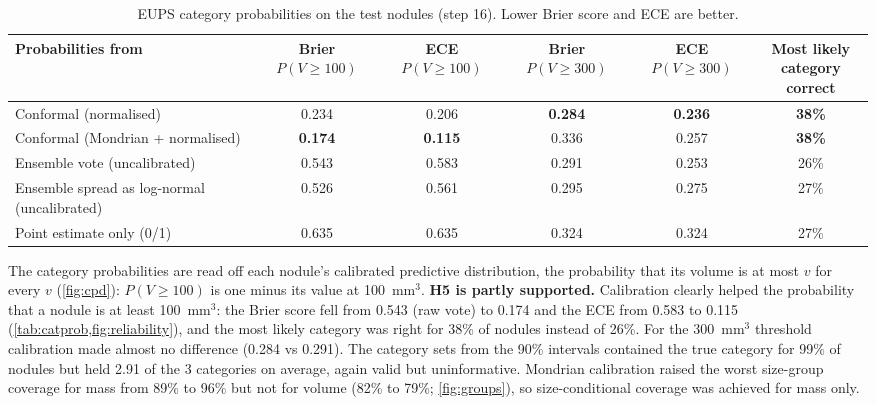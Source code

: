 \begin{table}[!htbp]
\centering\small
\caption{EUPS category probabilities on the test nodules (step 16). Lower Brier score and ECE are better.}
\label{tab:catprob}
\begin{adjustbox}{max width=\linewidth}
\begin{tabular}{l ccccc}
\toprule
Probabilities from & \makecell{Brier\\$P(V\geq100)$} & \makecell{ECE\\$P(V\geq100)$} & \makecell{Brier\\$P(V\geq300)$} & \makecell{ECE\\$P(V\geq300)$} & \makecell{Most likely\\category correct} \\
\midrule
Conformal (normalised) & 0.234 & 0.206 & \textbf{0.284} & \textbf{0.236} & \textbf{38\%} \\
Conformal (Mondrian + normalised) & \textbf{0.174} & \textbf{0.115} & 0.336 & 0.257 & \textbf{38\%} \\
Ensemble vote (uncalibrated) & 0.543 & 0.583 & 0.291 & 0.253 & 26\% \\
Ensemble spread as log-normal (uncalibrated) & 0.526 & 0.561 & 0.295 & 0.275 & 27\% \\
Point estimate only (0/1) & 0.635 & 0.635 & 0.324 & 0.324 & 27\% \\
\bottomrule
\end{tabular}
\end{adjustbox}
\end{table}

The category probabilities are read off each nodule's calibrated predictive distribution, the probability that its volume is at most $v$ for every $v$ (\cref{fig:cpd}): $P(V\geq100)$ is one minus its value at 100~mm$^3$. \textbf{H5 is partly supported.} Calibration clearly helped the probability that a nodule is at least 100~mm$^3$: the Brier score fell from 0.543 (raw vote) to 0.174 and the ECE from 0.583 to 0.115 (\cref{tab:catprob,fig:reliability}), and the most likely category was right for 38\% of nodules instead of 26\%. For the 300~mm$^3$ threshold calibration made almost no difference (0.284 vs 0.291). The category sets from the 90\% intervals contained the true category for 99\% of nodules but held 2.91 of the 3 categories on average, again valid but uninformative. Mondrian calibration raised the worst size-group coverage for mass from 89\% to 96\% but not for volume (82\% to 79\%; \cref{fig:groups}), so size-conditional coverage was achieved for mass only.


